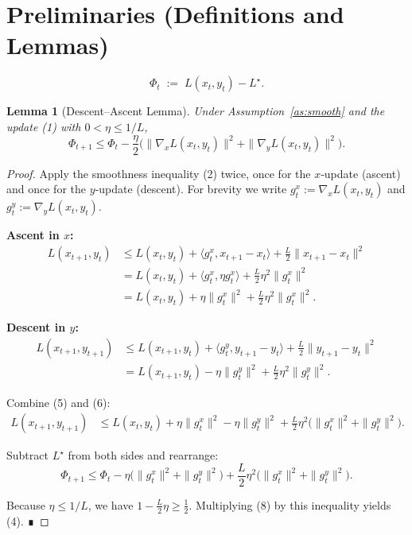 \documentclass{article}
\newtheorem{lemma}{Lemma}
\begin{document}
\newpage

\section*{Preliminaries (Definitions and Lemmas)}
\begin{definition}
\[
\Phi_t \;:=\; L(x_t,y_t)-L^{\star}.
\]
\end{definition}

\begin{lemma}[Descent–Ascent Lemma]\label{lem:da}
Under Assumption~\ref{as:smooth} and the update (1) with $0<\eta\le 1/L$,
\[
\Phi_{t+1}\le \Phi_t
      -\frac{\eta}{2}\bigl(\|\nabla_x L(x_t,y_t)\|^{2}
                         +\|\nabla_y L(x_t,y_t)\|^{2}\bigr).
\tag{4}
\]
\end{lemma}
\begin{proof}
Apply the smoothness inequality (2) twice, once for the $x$‑update (ascent)
and once for the $y$‑update (descent).  For brevity we write $g^x_t:=\nabla_x
L(x_t,y_t)$ and $g^y_t:=\nabla_y L(x_t,y_t)$.  

\textbf{Ascent in $x$:}
\[
\begin{aligned}
L(x_{t+1},y_t)
&\le L(x_t,y_t) + \langle g^x_t, x_{t+1}-x_t\rangle
                 +\frac{L}{2}\|x_{t+1}-x_t\|^{2}\\
&= L(x_t,y_t) + \langle g^x_t, \eta g^x_t\rangle
                 +\frac{L}{2}\eta^{2}\|g^x_t\|^{2}\\
&= L(x_t,y_t) + \eta\|g^x_t\|^{2}
                 +\frac{L}{2}\eta^{2}\|g^x_t\|^{2}.
\end{aligned}
\tag{5}
\]

\textbf{Descent in $y$:}
\[
\begin{aligned}
L(x_{t+1},y_{t+1})
&\le L(x_{t+1},y_t) + \langle g^y_t, y_{t+1}-y_t\rangle
                 +\frac{L}{2}\|y_{t+1}-y_t\|^{2}\\
&= L(x_{t+1},y_t) - \eta\|g^y_t\|^{2}
                 +\frac{L}{2}\eta^{2}\|g^y_t\|^{2}.
\end{aligned}
\tag{6}
\]

Combine (5) and (6):
\[
\begin{aligned}
L(x_{t+1},y_{t+1})
&\le L(x_t,y_t) + \eta\|g^x_t\|^{2}
               -\eta\|g^y_t\|^{2}
               +\frac{L}{2}\eta^{2}\bigl(\|g^x_t\|^{2}
                                        +\|g^y_t\|^{2}\bigr).
\end{aligned}
\tag{7}
\]

Subtract $L^{\star}$ from both sides and rearrange:
\[
\Phi_{t+1}
\le \Phi_t
    -\eta\bigl(\|g^x_t\|^{2}+\|g^y_t\|^{2}\bigr)
    +\frac{L}{2}\eta^{2}\bigl(\|g^x_t\|^{2}+\|g^y_t\|^{2}\bigr).
\tag{8}
\]

Because $\eta\le 1/L$, we have $1-\frac{L}{2}\eta \ge \frac{1}{2}$.
Multiplying (8) by this inequality yields (4).  ∎
\end{proof}
\end{document}
